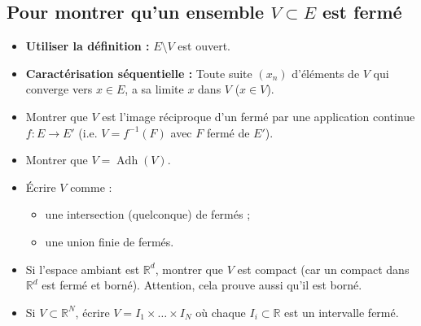 \documentclass[a4paper]{article}
\newcommand{\R}{\mathbb{R}}
\begin{document}
\subsection*{Pour montrer qu'un ensemble \(V \subset E\) est fermé}
\begin{itemize}
    \item \textbf{Utiliser la définition :} \( E \setminus V \) est ouvert.
    \item \textbf{Caractérisation séquentielle :} Toute suite \((x_n)\) d'éléments de \(V\) qui converge vers \(x \in E\), a sa limite \(x\) dans \(V\) (\(x \in V\)).
    \item Montrer que \(V\) est l'image réciproque d'un fermé par une application continue \(f:E \to E'\) (i.e. \(V = f^{-1}(F)\) avec \(F\) fermé de \(E'\)).
    \item Montrer que \(V = \operatorname{Adh}(V)\).
    \item Écrire \(V\) comme :
    \begin{itemize}
        \item une intersection (quelconque) de fermés ;
        \item une union finie de fermés.
    \end{itemize}
    \item Si l'espace ambiant est \(\R^d\), montrer que \(V\) est compact (car un compact dans \(\R^d\) est fermé et borné). Attention, cela prouve aussi qu'il est borné.
    \item Si \(V \subset \R^N\), écrire \(V = I_1 \times \dots \times I_N\) où chaque \( I_i \subset \R\) est un intervalle fermé.
\end{itemize}
\end{document}

